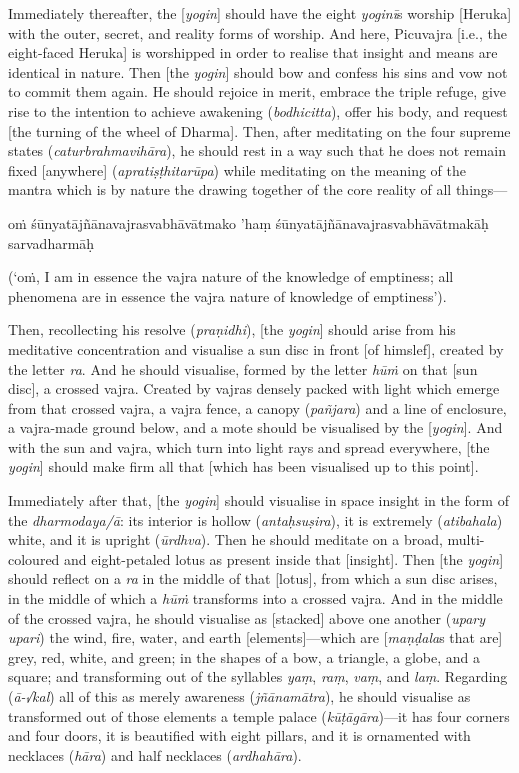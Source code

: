 \documentclass[naipra.tex]{subfiles}
\begin{document}
Immediately thereafter, the [\emph{yogin}] should have the eight \emph{yoginī}s worship [Heruka] with the outer, secret, and reality forms of worship. 
And here, Picuvajra [i.e., the eight-faced Heruka] is worshipped in order to realise that insight and means are identical in nature.
Then [the \emph{yogin}] should bow and confess his sins and vow not to commit them again.
He should rejoice in merit, embrace the triple refuge, give rise to the intention to achieve awakening (\emph{bodhicitta}), offer his body, and request [the turning of the wheel of Dharma].
Then, after meditating on the four supreme states (\emph{caturbrahmavihāra}), he should rest in a way such that he does not remain fixed [anywhere] (\emph{apratiṣṭhitarūpa}) while meditating on the meaning of the mantra which is by nature the drawing together of the core reality of all things—\begin{mantra}oṁ śūnyatājñānavajrasvabhāvātmako 'haṃ śūnyatājñānavajrasvabhāvātmakāḥ sarvadharmāḥ\end{mantra} (`oṁ, I am in essence the vajra nature of the knowledge of emptiness; all phenomena are in essence the vajra nature of knowledge of emptiness').

Then, recollecting his resolve (\emph{praṇidhi}), [the \emph{yogin}] should arise from his meditative concentration and visualise a sun disc in front [of himslef], created by the letter \emph{ra}.
And he should visualise, formed by the letter \emph{hūṁ} on that [sun disc], a crossed vajra.
Created by vajras densely packed with light which emerge from that crossed vajra, a vajra fence, a canopy (\emph{pañjara}) and a line of enclosure, a vajra-made ground below, and a mote should be visualised by the [\emph{yogin}].
And with the sun and vajra, which turn into light rays and spread everywhere, [the \emph{yogin}] should make firm all that [which has been visualised up to this point].

Immediately after that, [the \emph{yogin}] should visualise in space insight in the form of the \emph{dharmodaya/ā}: its interior is hollow (\emph{antaḥsuṣira}), it is extremely (\emph{atibahala}) white, and it is upright (\emph{ūrdhva}).
Then he should meditate on a broad, multi-coloured and eight-petaled lotus as present inside that [insight].
Then [the \emph{yogin}] should reflect on a \emph{ra} in the middle of that [lotus], from which a sun disc arises, in the middle of which a \emph{hūṁ} transforms into a crossed vajra. 
And in the middle of the crossed vajra, he should visualise as [stacked] above one another (\emph{upary upari}) the wind, fire, water, and earth [elements]—which are [\emph{maṇḍala}s that are] grey, red, white, and green; in the shapes of a bow, a triangle, a globe, and a square; and transforming out of the syllables \emph{yaṃ}, \emph{raṃ}, \emph{vaṃ}, and \emph{laṃ}.
Regarding (\emph{ā-√kal}) all of this as merely awareness (\emph{jñānamātra}), he should visualise as transformed out of those elements a temple palace (\emph{kūṭāgāra})—it has four corners and four doors, it is beautified with eight pillars, and it is ornamented with necklaces (\emph{hāra}) and half necklaces (\emph{ardhahāra}).
\end{document}
